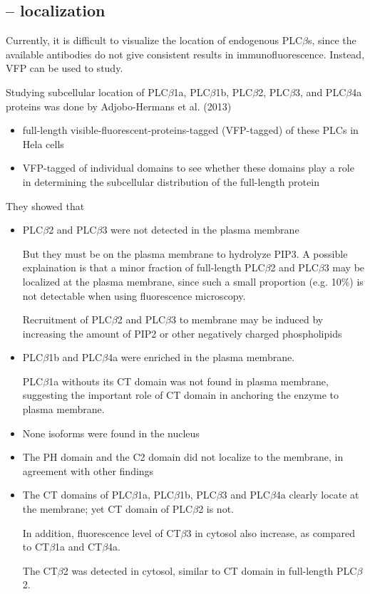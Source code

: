\subsection{-- localization}

Currently, it is difficult to visualize the location of endogenous
PLC$\beta$s, since the available antibodies do not give consistent results in
immunofluorescence. Instead, VFP can be used to study.

Studying subcellular location of PLC$\beta$1a, PLC$\beta$1b, PLC$\beta$2, PLC$\beta$3,
and PLC$\beta$4a proteins was done by Adjobo-Hermans et al. (2013) 
\begin{itemize}
  \item  full-length visible-fluorescent-proteins-tagged (VFP-tagged) of these
  PLCs in Hela cells
  \item VFP-tagged of individual domains to see whether these domains play a
  role in determining the subcellular distribution of the full-length protein
\end{itemize}

They showed that
\begin{itemize}
  \item  PLC$\beta$2 and PLC$\beta$3 were not detected in the plasma membrane
 
But they must be on the plasma membrane to hydrolyze PIP3. A possible
explaination is that a minor fraction of full-length PLC$\beta$2 and PLC$\beta$3
may be localized at the plasma membrane, since such a small proportion (e.g.
10\%) is not detectable when using fluorescence microscopy.
 
Recruitment of PLC$\beta$2 and PLC$\beta$3 to membrane may be induced by
increasing the amount of PIP2 or other negatively charged phospholipids

  \item PLC$\beta$1b and PLC$\beta$4a were enriched in the plasma membrane. 

PLC$\beta$1a withouts its CT domain was not found in plasma membrane, suggesting
the important role of CT domain in anchoring the enzyme to plasma membrane.

  \item  None isoforms were found in the nucleus
  
  \item The PH domain and the C2 domain did not localize to the membrane, in
  agreement with other findings
  
  \item The CT domains of PLC$\beta$1a, PLC$\beta$1b, PLC$\beta$3
  and PLC$\beta$4a clearly locate at the membrane; yet CT domain of PLC$\beta$2
  is not. 

In addition, fluorescence level of CT$\beta$3 in cytosol also increase, as
compared to CT$\beta$1a and CT$\beta$4a.

The CT$\beta$2 was detected in cytosol, similar to CT domain in full-length
PLC$\beta$2.

\end{itemize}


